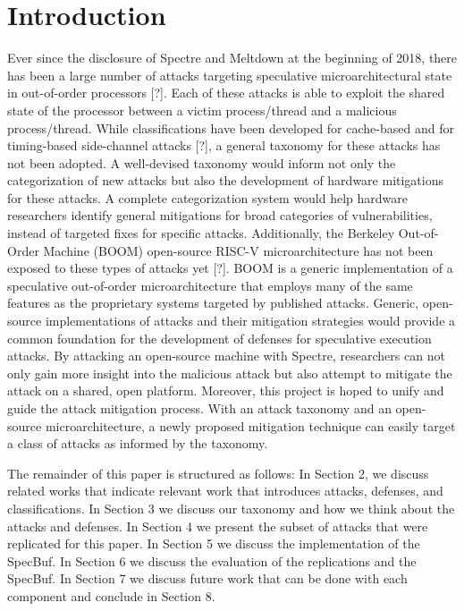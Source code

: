 \section{Introduction}

Ever since the disclosure of Spectre and Meltdown at the beginning of 2018, there has
been a large number of attacks targeting speculative microarchitectural state in
out-of-order processors [?]. Each of these attacks is able to exploit the shared
state of the processor between a victim process/thread and a malicious process/thread.
While classifications have been developed for cache-based and for timing-based 
side-channel attacks [?], a general taxonomy for these attacks has not been adopted.
A well-devised taxonomy would inform not only the 
categorization of new attacks but also the development of hardware mitigations for 
these attacks. A complete categorization system would help hardware researchers 
identify general mitigations for broad categories of vulnerabilities, instead of 
targeted fixes for specific attacks. Additionally, the Berkeley Out-of-Order Machine (BOOM) open-source RISC-V
microarchitecture has not been exposed to these types of attacks yet [?]. BOOM
is a generic implementation of a speculative 
out-of-order microarchitecture that employs many of the same features as the 
proprietary systems targeted by published attacks. Generic, open-source 
implementations of attacks and their mitigation strategies would provide a common 
foundation for the development of defenses for speculative execution attacks.
By attacking an open-source machine with Spectre, researchers can not only gain more 
insight into the malicious attack but also attempt to mitigate the attack on a shared,
open platform. Moreover, this project is hoped to unify and guide the attack 
mitigation process. With an attack taxonomy and an open-source microarchitecture, a 
newly proposed mitigation technique can easily target a class of attacks as informed 
by the taxonomy.

The remainder of this paper is structured as follows: In Section 2, we discuss
related works that indicate relevant work that introduces attacks, defenses, and classifications.
In Section 3 we discuss our taxonomy and how we think about the attacks and defenses. In
Section 4 we present the subset of attacks that were replicated for this paper. In Section 5
we discuss the implementation of the SpecBuf. In Section 6 we discuss the evaluation of the
replications and the SpecBuf. In Section 7 we discuss future work that can be done with each
component and conclude in Section 8.
